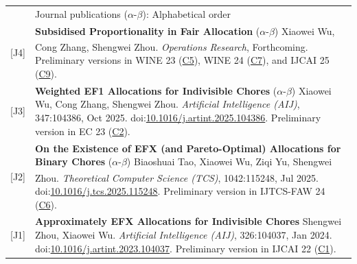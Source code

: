 \documentclass[letterpaper, 11pt]{article}
\newcommand{\headingfont}{\Large\color{OliveGreen}}
\newenvironment{SectionTable}[1]{
	\renewcommand*{\arraystretch}{1.2}
	\setlength{\tabcolsep}{10pt}
	\begin{longtable}{Rp{5.2in}} & #1 \\}
{\end{longtable}\vspace{-1cm}}
\begin{document}
\begin{SectionTable}{\headingfont Journal publications \; \small\color{black}  ($\alpha$-$\beta$): Alphabetical order}

[J4] &
\textbf{Subsidised Proportionality in Fair Allocation} \newline
($\alpha$-$\beta$) Xiaowei Wu, Cong Zhang, Shengwei Zhou\textsuperscript{\Letter}.  \newline
\textit{Operations Research}, Forthcoming. \newline Preliminary versions in WINE 23 (\hyperlink{OR-WINE23}{C5}), WINE 24 (\hyperlink{OR-WINE24}{C7}), and IJCAI 25 (\hyperlink{OR-IJCAI25}{C9}).\\

[J3] & 
\textbf{Weighted EF1 Allocations for Indivisible Chores} \newline
($\alpha$-$\beta$) Xiaowei Wu, Cong Zhang, Shengwei Zhou.  \newline
\textit{Artificial Intelligence (AIJ)}, 347:104386, Oct 2025. doi:\href{https://doi.org/10.1016/j.artint.2025.104386}{10.1016/j.artint.2025.104386}. \newline Preliminary version in EC 23 (\hyperlink{WEF1-EC23}{C2}).\\

[J2] & 
\textbf{On the Existence of EFX (and Pareto-Optimal) Allocations for Binary Chores} \newline
($\alpha$-$\beta$) Biaoshuai Tao, Xiaowei Wu, Ziqi Yu, Shengwei Zhou\textsuperscript{\Letter}.  \newline
\textit{Theoretical Computer Science (TCS)}, 1042:115248, Jul 2025.\newline 
doi:\href{https://doi.org/10.1016/j.tcs.2025.115248}{10.1016/j.tcs.2025.115248}. Preliminary version in IJTCS-FAW 24 (\hyperlink{EFX-IJTCS24}{C6}).\\

[J1] & 
\textbf{Approximately EFX Allocations for Indivisible Chores} \newline
Shengwei Zhou, Xiaowei Wu.  \newline
\textit{Artificial Intelligence (AIJ)}, 326:104037, Jan 2024. doi:\href{https://doi.org/10.1016/j.artint.2023.104037}{10.1016/j.artint.2023.104037}. \newline Preliminary version in IJCAI 22 (\hyperlink{EFX-IJCAI22}{C1}).\\

\end{SectionTable}

\end{document}

